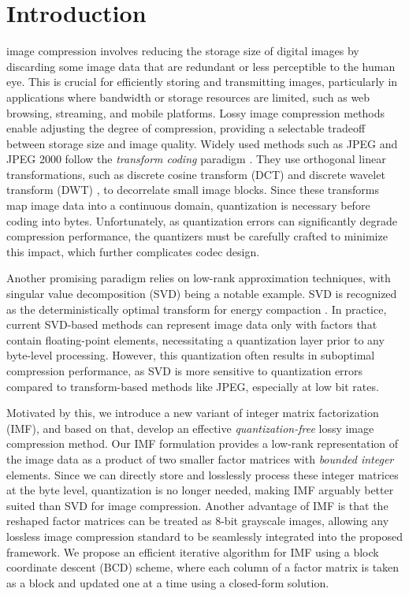 \section{Introduction} \label{sec:introduction}

 image compression involves reducing the storage size of digital images by discarding some image data that are redundant or less perceptible to the human eye. This is crucial for efficiently storing and transmitting images, particularly in applications where bandwidth or storage resources are limited, such as web browsing, streaming, and mobile platforms. Lossy image compression methods enable adjusting the degree of compression, providing a selectable tradeoff between storage size and image quality. Widely used methods such as JPEG \cite{wallace1991jpeg} and JPEG 2000 \cite{skodras2001jpeg} follow the \emph{transform coding} paradigm \cite{goyal2001theoretical}. They use orthogonal linear transformations, such as discrete cosine transform (DCT) \cite{ahmed1974discrete} and discrete wavelet transform (DWT) \cite{antonini1992image}, to decorrelate small image blocks. Since these transforms map image data into a continuous domain, quantization is necessary before coding into bytes. Unfortunately, as quantization errors can significantly degrade compression performance, the quantizers must be carefully crafted to minimize this impact, which further complicates codec design.

Another promising paradigm relies on low-rank approximation techniques, with singular value decomposition (SVD) being a notable example. SVD is recognized as the deterministically optimal transform for energy compaction \cite{andrews1976singular}. In practice, current SVD-based methods \cite{andrews1976singular, prasantha2007image, hou2015sparse} can represent image data only with factors that contain floating-point elements, necessitating a quantization layer prior to any byte-level processing. However, this quantization often results in suboptimal compression performance, as SVD is more sensitive to quantization errors compared to transform-based methods like JPEG, especially at low bit rates.

Motivated by this, we introduce a new variant of integer matrix factorization (IMF), and based on that, develop an effective \emph{quantization-free} lossy image compression method. Our IMF formulation provides a low-rank representation of the image data as a product of two smaller factor matrices with \emph{bounded integer} elements. Since we can directly store and losslessly process these integer matrices at the byte level, quantization is no longer needed, making IMF arguably better suited than SVD for image compression. Another advantage of IMF is that the reshaped factor matrices can be treated as 8-bit grayscale images, allowing any lossless image compression standard to be seamlessly integrated into the proposed framework. We propose an efficient iterative algorithm for IMF using a block coordinate descent (BCD) scheme, where each column of a factor matrix is taken as a block and updated one at a time using a closed-form solution.

